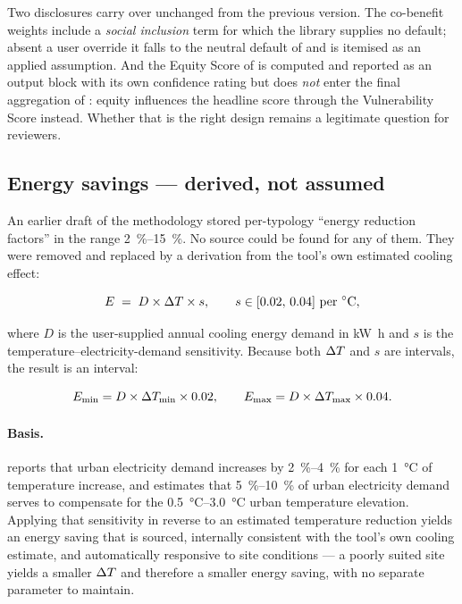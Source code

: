 Two disclosures carry over unchanged from the previous version. The co-benefit
weights include a \emph{social inclusion} term for which the library
supplies no default; absent a user override it falls to the neutral default of
 and is itemised as an applied assumption. And the Equity
Score of  is computed and reported as an output block with its
own confidence rating but does \emph{not} enter the final aggregation of
: equity influences the headline score through the
Vulnerability Score instead. Whether that is the right design remains a
legitimate question for reviewers.

\subsection{Energy savings --- derived, not assumed}
\label{sec:energy}

An earlier draft of the methodology stored per-typology ``energy reduction
factors'' in the range \SIrange{2}{15}{\percent}. No source could be found for
any of them. They were removed and replaced by a derivation from the tool's own
estimated cooling effect:

\begin{equation}
\label{eq:energy}
E \;=\; D \times \dT \times s,
\qquad s \in [0.02,\, 0.04]\ \text{per \si{\degreeCelsius}},
\end{equation}

where $D$ is the user-supplied annual cooling energy demand in
\unit{\kilo\watt\hour} and $s$ is the temperature--electricity-demand
sensitivity. Because both $\Delta T$ and $s$ are intervals, the result is an
interval:

\begin{equation}
\label{eq:energy-range}
E_{\min} = D \times \Delta T_{\min} \times 0.02,
\qquad
E_{\max} = D \times \Delta T_{\max} \times 0.04 .
\end{equation}

\paragraph{Basis.} \textcite{akbari2001} reports that urban electricity demand
increases by \SIrange{2}{4}{\percent} for each \qty{1}{\degreeCelsius} of
temperature increase, and estimates that \SIrange{5}{10}{\percent} of urban
electricity demand serves to compensate for the
\SIrange{0.5}{3.0}{\degreeCelsius} urban temperature elevation. Applying that
sensitivity in reverse to an estimated temperature reduction yields an energy
saving that is sourced, internally consistent with the tool's own cooling
estimate, and automatically responsive to site conditions --- a poorly suited
site yields a smaller $\Delta T$ and therefore a smaller energy saving, with no
separate parameter to maintain.

